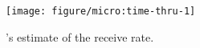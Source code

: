 \begin{figure}
    \centering
\begin{knitrout}
\color{fgcolor}
\texttt{[image: figure/micro:time-thru-1]} 

\end{knitrout}

    \caption{\name's estimate of the receive rate.}
    \label{fig:micro:time-thru}
\end{figure}
